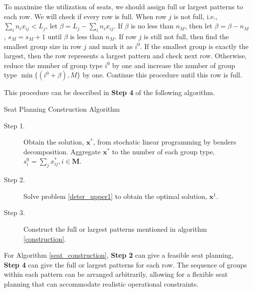 To maximize the utilization of seats, we should assign full or largest patterns to each row. We will check if every row is full. When row $j$ is not full, i.e., $\sum_{i} n_{i} x_{ij} < L_{j}$, let $\beta = L_{j} - \sum_{i} n_{i} x_{ij}$. If $\beta$ is no less than $n_M$, then let $\beta = \beta - n_M$, $s_M = s_M +1$ until $\beta$ is less than $n_M$. If row $j$ is still not full, then find the smallest group size in row $j$ and mark it as $i^0$. If the smallest group is exactly the largest, then the row represents a largest pattern and check next row. Otherwise, reduce the number of group type $i^0$ by one and increase the number of group type $\min \{(i^0+\beta), M\}$ by one. Continue this procedure until this row is full.


This procedure can be described in {\bf Step 4} of the following algorithm.

\begin{algorithm}[H]
  \caption{Seat Planning Construction Algorithm}\label{seat_construction}
    \begin{description}
    \item[Step 1.] Obtain the solution, $\mathbf{x}^{*}$, from stochatic linear programming by benders decomposition. Aggregate $\mathbf{x}^{*}$ to the number of each group type, ${s}_{i}^{0} =\sum_{j} x^{*}_{ij}, i \in \mathbf{M}$.
    \item[Step 2.] Solve problem \eqref{deter_upper1} to obtain the optimal solution, $\mathbf{x}^{1}$. 
    \item[Step 3.] Construct the full or largest patterns mentioned in algorithm \ref{construction}.
   \end{description}
  \end{algorithm}

For Algorithm \ref{seat_construction}, {\bf Step 2} can give a feasible seat planning, {\bf Step 4} can give the full or largest patterns for each row. The sequence of groups within each pattern can be arranged arbitrarily, allowing for a flexible seat planning that can accommodate realistic operational constraints. 






